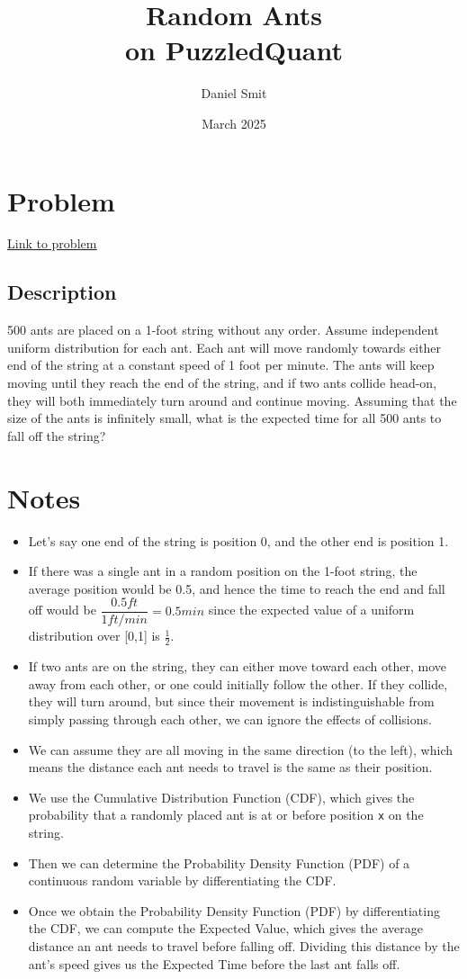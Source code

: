 \documentclass[10pt]{article}
\title{Random Ants \\
  \large on PuzzledQuant}
\author{Daniel Smit}
\date{March 2025}
\begin{document}
\maketitle

\section{Problem}

\href{https://www.puzzledquant.com/problems/clhudg9eo000mmm08opjz067x}{\underline{Link to problem}}

\subsection{Description}
500 ants are placed on a 1-foot string without any order. Assume independent uniform distribution for each ant. Each ant will move randomly towards either end of the string at a constant speed of 1 foot per minute. The ants will keep moving until they reach the end of the string, and if two ants collide head-on, they will both immediately turn around and continue moving. Assuming that the size of the ants is infinitely small, what is the expected time for all 500 ants to fall off the string?

\section{Notes}

\begin{itemize}
  \item Let's say one end of the string is position 0, and the other end is position 1.
  \item If there was a single ant in a random position on the 1-foot string, the average position would be 0.5, and hence the time to reach the end and fall off would be $\dfrac{0.5 ft}{1 ft/min} = 0.5 min$ since the expected value of a uniform distribution over [0,1] is $\frac{1}{2}$.
  \item If two ants are on the string, they can either move toward each other, move away from each other, or one could initially follow the other. If they collide, they will turn around, but since their movement is indistinguishable from simply passing through each other, we can ignore the effects of collisions.
  \item We can assume they are all moving in the same direction (to the left), which means the distance each ant needs to travel is the same as their position.
  \item We use the Cumulative Distribution Function (CDF), which gives the probability that a randomly placed ant is at or before position \texttt{x} on the string.
  \item Then we can determine the Probability Density Function (PDF) of a continuous random variable by differentiating the CDF.
  \item Once we obtain the Probability Density Function (PDF) by differentiating the CDF, we can compute the Expected Value, which gives the average distance an ant needs to travel before falling off. Dividing this distance by the ant's speed gives us the Expected Time before the last ant falls off.
\end{itemize}
\end{document}
